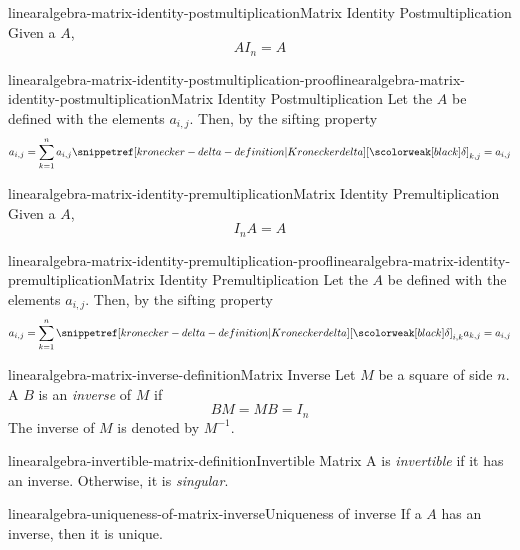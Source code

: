 \documentclass[preview]{standalone}
\begin{document}
\begin{snippetproposition}{linearalgebra-matrix-identity-postmultiplication}{Matrix Identity Postmultiplication}
    Given a \matrix \(A\),
    \[ AI_n=A \]
\end{snippetproposition}

\begin{snippetproof}{linearalgebra-matrix-identity-postmultiplication-proof}{linearalgebra-matrix-identity-postmultiplication}{Matrix Identity Postmultiplication}
    Let the \matrix \(A\) be defined with the
    elements \(a_{i,j}\).
    Then, by the sifting property %
    \[
        a_{i,j} = \sum_{k=1}^n
        a_{i,j}\kronecker_{k,j} = a_{i,j}
    \]
\end{snippetproof}

\begin{snippetproposition}{linearalgebra-matrix-identity-premultiplication}{Matrix Identity Premultiplication}
    Given a \matrix \(A\),
    \[ I_n A=A \]
\end{snippetproposition}

\begin{snippetproof}{linearalgebra-matrix-identity-premultiplication-proof}{linearalgebra-matrix-identity-premultiplication}{Matrix Identity Premultiplication}
    Let the \matrix \(A\) be defined with the
    elements \(a_{i,j}\).
    Then, by the sifting property %
    \[
        a_{i,j} = \sum_{k=1}^n
        \kronecker_{i,k}a_{k,j} = a_{i,j}
    \]
\end{snippetproof}

\begin{snippetdefinition}{linearalgebra-matrix-inverse-definition}{Matrix Inverse}
    Let \(M\) be a square \matrix of side \(n\).
    A \matrix \(B\) is an \textit{inverse}
    of \(M\) if \[BM=MB=I_n\]
    The inverse of \(M\) is denoted by \(M^{-1}\).
\end{snippetdefinition}

\begin{snippetdefinition}{linearalgebra-invertible-matrix-definition}{Invertible Matrix}
    A \matrix is \textit{invertible} if it has an inverse.
    Otherwise, it is \textit{singular}.
\end{snippetdefinition}

\begin{snippetproposition}{linearalgebra-uniqueness-of-matrix-inverse}{Uniqueness of \matrix inverse}
    If a \matrix \(A\) has an inverse, then it is unique.
\end{snippetproposition}
\end{document}
